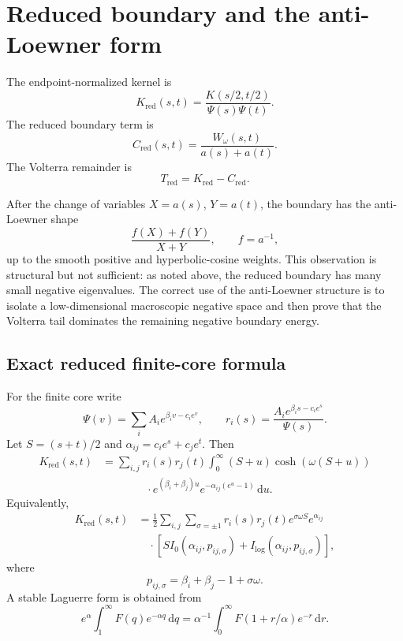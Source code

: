 \documentclass[11pt]{article}
\newcommand{\dd}{\,\mathrm d}
\newcommand{\Kred}{K_{\mathrm{red}}}
\newcommand{\Cred}{C_{\mathrm{red}}}
\newcommand{\Tred}{T_{\mathrm{red}}}
\begin{document}
\section{Reduced boundary and the anti-Loewner form}

The endpoint-normalized kernel is
\[
   \Kred(s,t)=\frac{K(s/2,t/2)}{\Psi(s)\Psi(t)}.
\]
The reduced boundary term is
\begin{equation}
   \Cred(s,t)=\frac{W_\omega(s,t)}{a(s)+a(t)}.
   \label{eq:Cred}
\end{equation}
The Volterra remainder is
\[
   \Tred=\Kred-\Cred.
\]

After the change of variables $X=a(s)$, $Y=a(t)$, the boundary has the
anti-Loewner shape
\[
   \frac{f(X)+f(Y)}{X+Y},
   \qquad f=a^{-1},
\]
up to the smooth positive and hyperbolic-cosine weights.  This observation is
structural but not sufficient: as noted above, the reduced boundary has many
small negative eigenvalues.  The correct use of the anti-Loewner structure is
to isolate a low-dimensional macroscopic negative space and then prove that
the Volterra tail dominates the remaining negative boundary energy.

\subsection{Exact reduced finite-core formula}

For the finite core write
\[
   \Psi(v)=\sum_i A_i e^{\beta_i v-c_ie^v},
   \qquad
   r_i(s)=\frac{A_i e^{\beta_i s-c_ie^s}}{\Psi(s)}.
\]
Let $S=(s+t)/2$ and $\alpha_{ij}=c_ie^s+c_je^t$.  Then
\begin{equation}
\begin{aligned}
 \Kred(s,t)
 &=
 \sum_{i,j}r_i(s)r_j(t)
 \int_0^\infty
 (S+u)\cosh(\omega(S+u))
 \\
 &\qquad\qquad\cdot
 e^{(\beta_i+\beta_j)u}
 e^{-\alpha_{ij}(e^u-1)}\dd u.
\end{aligned}
\label{eq:Kred-u}
\end{equation}
Equivalently,
\begin{equation}
\begin{aligned}
 \Kred(s,t)
 &=
 \frac12\sum_{i,j}\sum_{\sigma=\pm1}
 r_i(s)r_j(t)e^{\sigma\omega S}e^{\alpha_{ij}}
 \\
 &\quad\cdot
 \left[
   S I_0(\alpha_{ij},p_{ij,\sigma})
   + I_{\log}(\alpha_{ij},p_{ij,\sigma})
 \right],
\end{aligned}
\label{eq:Kred-q}
\end{equation}
where
\[
  p_{ij,\sigma}=\beta_i+\beta_j-1+\sigma\omega.
\]
A stable Laguerre form is obtained from
\[
  e^\alpha\int_1^\infty F(q)e^{-\alpha q}\dd q
  =
  \alpha^{-1}\int_0^\infty F(1+r/\alpha)e^{-r}\dd r.
\]
\end{document}
